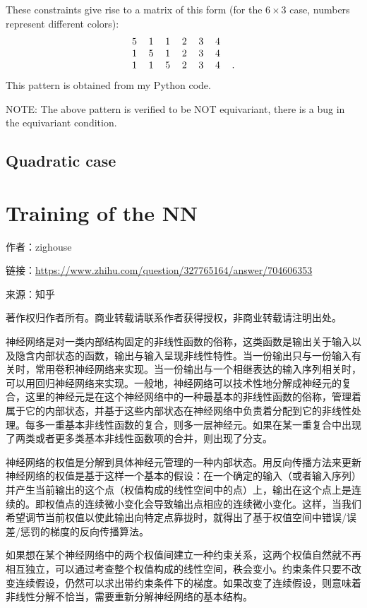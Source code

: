 These constraints give rise to a matrix of this form (for the $6 \times 3$ case, numbers represent different colors):
\begin{equation}
\begin{tabular}{c c c c c c c}
5 & 1 & 1 & 2 & 3 & 4 & \\
1 & 5 & 1 & 2 & 3 & 4 & \\
1 & 1 & 5 & 2 & 3 & 4 & .
\end{tabular} 
\end{equation}This pattern is obtained from my Python code.

NOTE:  The above pattern is verified to be NOT equivariant, there is a bug in the equivariant condition.

\subsection{Quadratic case}

\section{Training of the NN}

作者：zighouse

链接：\url{https://www.zhihu.com/question/327765164/answer/704606353}

来源：知乎

著作权归作者所有。商业转载请联系作者获得授权，非商业转载请注明出处。

神经网络是对一类内部结构固定的非线性函数的俗称，这类函数是输出关于输入以及隐含内部状态的函数，输出与输入呈现非线性特性。当一份输出只与一份输入有关时，常用卷积神经网络来实现。当一份输出与一个相继表达的输入序列相关时，可以用回归神经网络来实现。一般地，神经网络可以技术性地分解成神经元的复合，这里的神经元是在这个神经网络中的一种最基本的非线性函数的俗称，管理着属于它的内部状态，并基于这些内部状态在神经网络中负责着分配到它的非线性处理。每多一重基本非线性函数的复合，则多一层神经元。如果在某一重复合中出现了两类或者更多类基本非线性函数项的合并，则出现了分支。

神经网络的权值是分解到具体神经元管理的一种内部状态。用反向传播方法来更新神经网络的权值是基于这样一个基本的假设：在一个确定的输入（或者输入序列）并产生当前输出的这个点（权值构成的线性空间中的点）上，输出在这个点上是连续的。即权值点的连续微小变化会导致输出点相应的连续微小变化。这样，当我们希望调节当前权值以使此输出向特定点靠拢时，就得出了基于权值空间中错误/误差/惩罚的梯度的反向传播算法。

如果想在某个神经网络中的两个权值间建立一种约束关系，这两个权值自然就不再相互独立，可以通过考查整个权值构成的线性空间，秩会变小。约束条件只要不改变连续假设，仍然可以求出带约束条件下的梯度。如果改变了连续假设，则意味着非线性分解不恰当，需要重新分解神经网络的基本结构。

